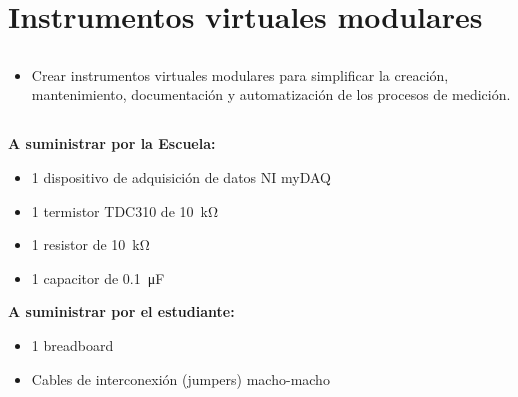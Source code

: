 \chapter{Instrumentos virtuales modulares}
\section{\obj}
\capacidad
\begin{itemize}
\item Crear instrumentos virtuales modulares para simplificar la creación, mantenimiento, documentación y automatización de los procesos de medición.
\end{itemize}

\section{\mat}
\textbf{A suministrar por la Escuela:}
\begin{itemize}
\item 1 dispositivo de adquisición de datos NI myDAQ
\item 1 termistor TDC310 de \SI{10}{\kilo\ohm} 
\item 1 resistor de \SI{10}{\kilo\ohm}
\item 1 capacitor de \SI{0.1}{\micro\farad}

\end{itemize}
\textbf{A suministrar por el estudiante:}
\begin{itemize}
\item 1 breadboard
\item Cables de interconexión (jumpers) macho-macho
\end{itemize}


